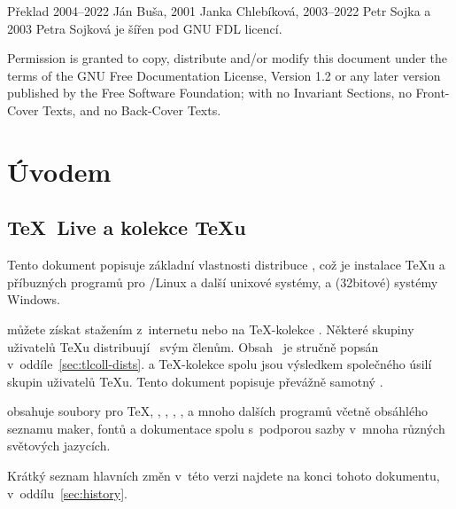 \documentclass[\classoptions,slovak,english,czech]{\classname}
\newcommand\TKCS{\textsf{\TeX-kolekce}}
\begin{document}
\ifnum{}
  \thispagestyle{csbul}
  \ifforbulletin \setcounter{page}{113} %
  \else \raggedbottom
  \fi
\fi

Překlad 
  2004--2022 Ján Buša, 
  2001 Janka Chlebíková,
  2003--2022 Petr Sojka a 
  2003 Petra Sojková 
je šířen pod GNU FDL licencí.
  
Permission is granted to copy, distribute and/or modify this document
under the terms of the GNU Free Documentation License, Version 1.2
or any later version published by the Free Software Foundation;
with no Invariant Sections, no Front-Cover Texts, and no
Back-Cover Texts.

\bigskip  %


\tableofcontents

\section{Úvodem}
\label{sec:intro}

\subsection{\TeX\ Live a kolekce \TeX{}u}

Tento dokument popisuje základní vlastnosti distribuce \TeXLive{} \thisyear,
což je instalace \TeX{}u a příbuzných programů pro /Linux a další
unixové systémy, \MacOSX{} a (32bitové) systémy Windows.

\TL{} můžete získat stažením z~internetu nebo na \TKCS{} \DVD.
Některé skupiny uživatelů \TeX{}u distribuují \DVD\ svým členům. 
Obsah \DVD\ je stručně popsán v~oddíle~\ref{sec:tlcoll-dists}.
\TL{} a \TKCS{} spolu jsou výsledkem společného úsilí 
skupin uživatelů \TeX u. Tento dokument popisuje převážně samotný \TL{}.

\TL{} obsahuje  soubory pro \TeX, \LaTeXe, \ConTeXt, 
\MF, \MP, \BibTeX{} a mnoho dalších programů včetně obsáhlého
seznamu maker, fontů a dokumentace spolu s~podporou
sazby v~mnoha různých světových jazycích. 


Krátký seznam hlavních změn v~této verzi \TL{}
najdete na konci tohoto dokumentu, v~oddílu~\ref{sec:history}. 
\end{document}
